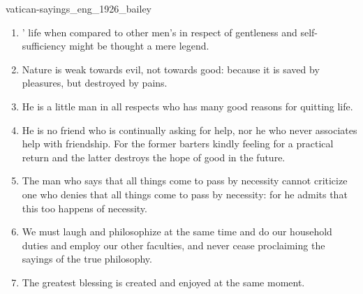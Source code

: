 \documentclass{stex}
\begin{document}
\begin{smodule}{vatican-sayings_eng_1926_bailey}
\begin{sparagraph}[id=vatican-sayings,name={Vatican Sayings}]
\begin{enumerate}[listparindent=0cm]
    \item\begin{sparagraph}[id=saying:36,name=Vatican Saying 36]
      ’ life when compared to other men’s in respect of gentleness and self-sufficiency might be thought a mere legend.
    \end{sparagraph}

    \item\begin{sparagraph}[id=saying:37,name=Vatican Saying 37]
      Nature is weak towards evil, not towards good: because it is saved by pleasures, but destroyed by pains.
    \end{sparagraph}

    \item\begin{sparagraph}[id=saying:38,name=Vatican Saying 38]
      He is a little man in all respects who has many good reasons for quitting life.
    \end{sparagraph}

    \item\begin{sparagraph}[id=saying:39,name=Vatican Saying 39]
      He is no friend who is continually asking for help, nor he who never associates help with friendship.
      For the former barters kindly feeling for a practical return and the latter destroys the hope of good in the future.
    \end{sparagraph}

    \item\begin{sparagraph}[id=saying:40,name=Vatican Saying 40]
      The man who says that all things come to pass by necessity cannot criticize one who denies that all things come to pass by necessity: for he admits that this too happens of necessity.
    \end{sparagraph}

    \item\begin{sparagraph}[id=saying:41,name=Vatican Saying 41]
      We must laugh and philosophize at the same time and do our household duties and employ our other faculties, and never cease proclaiming the sayings of the true philosophy.
    \end{sparagraph}

    \item\begin{sparagraph}[id=saying:42,name=Vatican Saying 42]
      The greatest blessing is created and enjoyed at the same moment.
    \end{sparagraph}


\end{enumerate}
\end{sparagraph}
\end{smodule}
\end{document}
